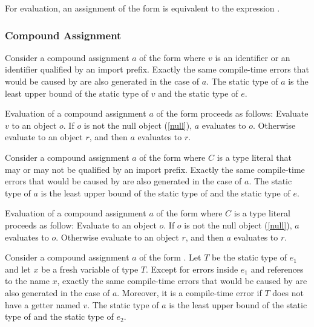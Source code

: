 \documentclass[makeidx]{article}
\begin{document}
{\LMHash{}%
For evaluation, an assignment of the form 
is equivalent to the expression .
\EndCase


\subsubsection{Compound Assignment}

\LMHash{}%
Consider a compound assignment $a$ of the form 
where $v$ is an identifier or an identifier qualified by an import prefix.
Exactly the same compile-time errors that would be caused by
are also generated in the case of $a$.
The static type of $a$ is
the least upper bound of the static type of $v$ and the static type of $e$.

\LMHash{}%
Evaluation of a compound assignment $a$ of the form 
proceeds as follows:
Evaluate $v$ to an object $o$.
If $o$ is not the null object (\ref{null}), $a$ evaluates to $o$.
Otherwise evaluate  to an object $r$,
and then $a$ evaluates to $r$.
\EndCase

\LMHash{}%
Consider a compound assignment $a$ of the form 
where $C$ is a type literal
that may or may not be qualified by an import prefix.
Exactly the same compile-time errors that would be caused by
are also generated in the case of $a$.
The static type of $a$ is the least upper bound of
the static type of  and the static type of $e$.

\LMHash{}%
Evaluation of a compound assignment $a$ of the form 
where $C$ is a type literal proceeds as follow:
Evaluate  to an object $o$.
If $o$ is not the null object (\ref{null}), $a$ evaluates to $o$.
Otherwise evaluate  to an object $r$,
and then $a$ evaluates to $r$.
\EndCase

\LMHash{}%
Consider a compound assignment $a$ of the form .
Let $T$ be the static type of $e_1$ and let $x$ be a fresh variable of type $T$.
Except for errors inside $e_1$ and references to the name $x$,
exactly the same compile-time errors that would be caused by
are also generated in the case of $a$.
Moreover, it is a compile-time error if $T$ does not have a getter named $v$.
The static type of $a$ is the least upper bound of
the static type of  and the static type of $e_2$.

}
\end{document}
